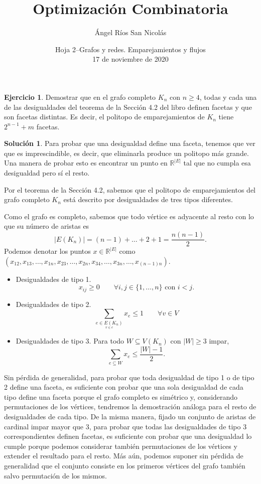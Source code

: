 \documentclass[10pt]{article}
\author{Ángel Ríos San Nicolás}
\title{Optimización Combinatoria}
\date{Hoja 2--Grafos y redes. Emparejamientos y flujos\\ 17 de noviembre de 2020}
\theoremstyle{definition}
\newtheorem{ejer}{Ejercicio}
\newtheorem*{sol}{Solución}
\begin{document}
\maketitle
\begin{ejer}Demostrar que en el grafo completo $K_n$ con $n\geq 4$, todas y cada una de las desigualdades del teorema de la Sección 4.2 del libro definen facetas y que son facetas distintas. Es decir, el politopo de emparejamientos de $K_n$ tiene $2^{n-1}+m$ facetas.\end{ejer}
\begin{sol}
Para probar que una desigualdad define una faceta, tenemos que ver que es imprescindible, es decir, que eliminarla produce un politopo más grande. Una manera de probar esto es encontrar un punto en $\mathbb{R}^{|E|}$ tal que no cumpla esa desigualdad pero sí el resto. 

Por el teorema de la Sección 4.2, sabemos que el politopo de emparejamientos del grafo completo $K_n$ está descrito por desigualdades de tres tipos diferentes.

Como el grafo es completo, sabemos que todo vértice es adyacente al resto con lo que su número de aristas es $$|E(K_n)|=(n-1)+\ldots+2+1=\frac{n(n-1)}{2}.$$ Podemos denotar los puntos $x\in\mathbb{R}^{|E|}$ como $(x_{12},x_{13},\ldots,x_{1n},x_{23},\ldots,x_{2n},x_{34},\ldots,x_{3n},\ldots,x_{(n-1)n})$.

\begin{itemize}
\item Desigualdades de tipo 1. 
$$x_{ij}\geq 0\qquad\forall i,j\in\{1,\ldots, n\}\text{ con }i<j.$$

\item Desigualdades de tipo 2.
$$\sum_{\underset{v\in e}{e\in E(K_n)}}x_e\leq 1\qquad\forall v\in V$$
\item Desigualdades de tipo 3. Para todo $W\subseteq V(K_n)$ con $|W|\geq 3$ impar,
$$\sum_{e\subseteq W} x_e\leq\frac{|W|-1}{2}.$$
\end{itemize}

Sin pérdida de generalidad, para probar que toda desigualdad de tipo 1 o de tipo 2 define una faceta, es suficiente con probar que una sola desigualdad de cada tipo define una faceta porque el grafo completo es simétrico y, considerando permutaciones de los vértices, tendremos la demostración análoga para el resto de desigualdades de cada tipo. De la misma manera, fijado un conjunto de aristas de cardinal impar mayor que $3$, para probar que todas las desigualdades de tipo 3 correspondientes definen facetas, es suficiente con probar que una desigualdad lo cumple porque podemos considerar también permutaciones de los vértices y extender el resultado para el resto. Más aún, podemos suponer sin pérdida de generalidad que el conjunto consiste en los primeros vértices del grafo también salvo permutación de los mismos.


\end{sol}
\end{document}
